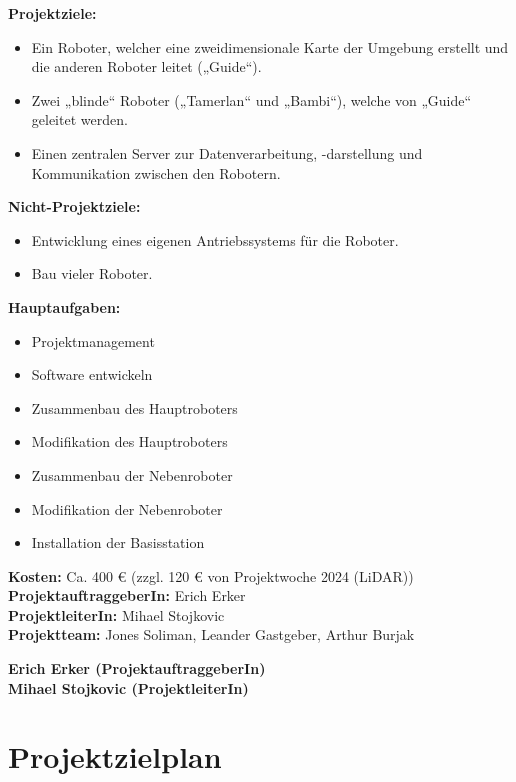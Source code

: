 \textbf{Projektziele:}
\begin{itemize}
    \item Ein Roboter, welcher eine zweidimensionale Karte der Umgebung erstellt und die anderen Roboter leitet („Guide“).
    \item Zwei „blinde“ Roboter („Tamerlan“ und „Bambi“), welche von „Guide“ geleitet werden.
    \item Einen zentralen Server zur Datenverarbeitung, -darstellung und Kommunikation zwischen den Robotern.
\end{itemize}

\textbf{Nicht-Projektziele:}
\begin{itemize}
    \item Entwicklung eines eigenen Antriebssystems für die Roboter.
    \item Bau vieler Roboter.
\end{itemize}

\textbf{Hauptaufgaben:}
\begin{itemize}
    \item Projektmanagement
    \item Software entwickeln
    \item Zusammenbau des Hauptroboters
    \item Modifikation des Hauptroboters
    \item Zusammenbau der Nebenroboter
    \item Modifikation der Nebenroboter
    \item Installation der Basisstation
\end{itemize}

\textbf{Kosten:} Ca. 400 € (zzgl. 120 € von Projektwoche 2024 (LiDAR)) \\

\textbf{ProjektauftraggeberIn:} Erich Erker \\
\textbf{ProjektleiterIn:} Mihael Stojkovic \\
\textbf{Projektteam:} Jones Soliman, Leander Gastgeber, Arthur Burjak \\

\vspace{0,5cm}
\begin{center}
\textbf{Erich Erker (ProjektauftraggeberIn) \\ Mihael Stojkovic (ProjektleiterIn)}
\end{center}

\newpage

\section{Projektzielplan}


